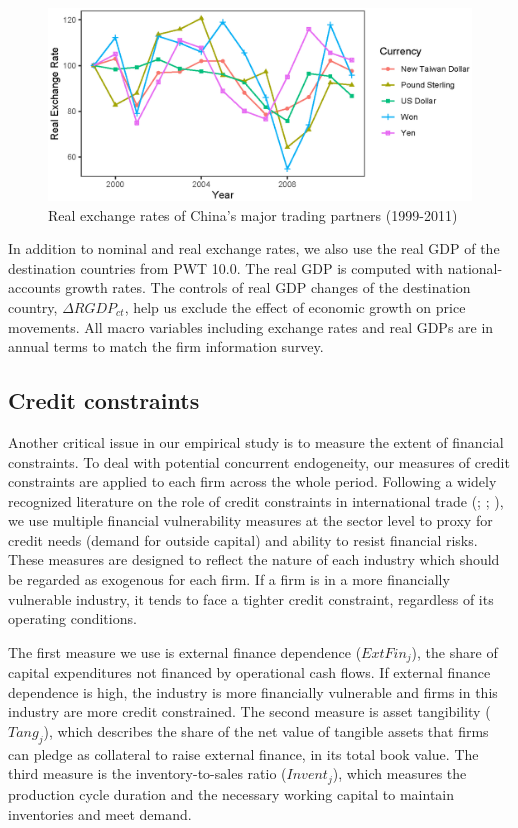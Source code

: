 \documentclass[12pt]{article}
\begin{document}
\begin{figure}[htbp]
	\centering
	\includegraphics[width=1\textwidth]{figure/figure2.eps}
	\caption{Real exchange rates of China's major trading partners (1999-2011)}
	\label{fig.RER}
\end{figure}

In addition to nominal and real exchange rates, we also use the real GDP of the destination countries from PWT 10.0. The real GDP is computed with national-accounts growth rates. The controls of real GDP changes of the destination country, $\Delta RGDP_{ct}$, help us exclude the effect of economic growth on price movements. All macro variables including exchange rates and real GDPs are in annual terms to match the firm information survey.

\subsection{Credit constraints} \label{Credit constraints}

Another critical issue in our empirical study is to measure the extent of financial constraints. To deal with potential concurrent endogeneity, our measures of credit constraints are applied to each firm across the whole period. Following a widely recognized literature on the role of credit constraints in international trade (\cite{kroszner2007}; \cite{manova-wei-zhang2015}; \cite{fan-lai-li2015}), we use multiple financial vulnerability measures at the sector level to proxy for credit needs (demand for outside capital) and ability to resist financial risks. These measures are designed to reflect the nature of each industry which should be regarded as exogenous for each firm. If a firm is in a more financially vulnerable industry, it tends to face a tighter credit constraint, regardless of its operating conditions.

The first measure we use is external finance dependence ($ExtFin_j$), the share of capital expenditures not financed by operational cash flows. If external finance dependence is high, the industry is more financially vulnerable and firms in this industry are more credit constrained. The second measure is asset tangibility ($Tang_j$), which describes the share of the net value of tangible assets that firms can pledge as collateral to raise external finance, in its total book value. The third measure is the inventory-to-sales ratio ($Invent_j$), which measures the production cycle duration and the necessary working capital to maintain inventories and meet demand.  
\end{document}
